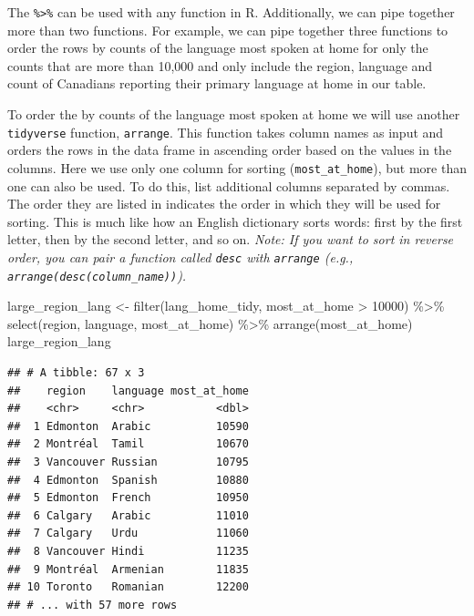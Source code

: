 \documentclass[
]{krantz}
\makeatletter
\newenvironment{Shaded}{\begin{snugshade}}{\end{snugshade}}
\newcommand{\DecValTok}[1]{\textcolor[rgb]{0.06,0.06,0.06}{#1}}
\newcommand{\FunctionTok}[1]{\textcolor[rgb]{0,0,0}{#1}}
\newcommand{\NormalTok}[1]{#1}
\newcommand{\OtherTok}[1]{\textcolor[rgb]{0.37,0.37,0.37}{#1}}
\newcommand{\SpecialCharTok}[1]{\textcolor[rgb]{0,0,0}{#1}}
\newenvironment{kframe}{%
\medskip{}
\setlength{\fboxsep}{.8em}
 \def\at@end@of@kframe{}%
 \ifinner\ifhmode%
  \def\at@end@of@kframe{\end{minipage}}%
  \begin{minipage}{\columnwidth}%
 \fi\fi%
 \def\FrameCommand##1{\hskip\@totalleftmargin \hskip-\fboxsep
 \colorbox{shadecolor}{##1}\hskip-\fboxsep
     \hskip-\linewidth \hskip-\@totalleftmargin \hskip\columnwidth}%
 \MakeFramed {\advance\hsize-\width
   \@totalleftmargin\z@ \linewidth\hsize
   \@setminipage}}%
 {\par\unskip\endMakeFramed%
 \at@end@of@kframe}
\renewenvironment{Shaded}{\begin{kframe}}{\end{kframe}}
\makeatother
\begin{document}
The \texttt{\%\textgreater{}\%} can be used with any function in R. Additionally, we can pipe together more than two functions. For example, we can pipe together three functions to order the rows by counts of the language most spoken at home for only the counts that are more than 10,000 and only include the region, language and count of Canadians reporting their primary language at home in our table.

To order the by counts of the language most spoken at home we will use another
\texttt{tidyverse} function, \texttt{arrange}. This function takes column names as input and
orders the rows in the data frame in ascending order based on the values in the
columns. Here we use only one column for sorting (\texttt{most\_at\_home}), but more than
one can also be used. To do this, list additional columns separated by commas.
The order they are listed in indicates the order in which they will be used for
sorting. This is much like how an English dictionary sorts words: first by the
first letter, then by the second letter, and so on. \emph{Note: If you want to sort
in reverse order, you can pair a function called \texttt{desc} with \texttt{arrange} (e.g.,
\texttt{arrange(desc(column\_name))}).}

\begin{Shaded}
\begin{Highlighting}[]
\NormalTok{large\_region\_lang }\OtherTok{\textless{}{-}} \FunctionTok{filter}\NormalTok{(lang\_home\_tidy, most\_at\_home }\SpecialCharTok{\textgreater{}} \DecValTok{10000}\NormalTok{) }\SpecialCharTok{\%\textgreater{}\%}
  \FunctionTok{select}\NormalTok{(region, language, most\_at\_home) }\SpecialCharTok{\%\textgreater{}\%}
  \FunctionTok{arrange}\NormalTok{(most\_at\_home)}
\NormalTok{large\_region\_lang}
\end{Highlighting}
\end{Shaded}

\begin{verbatim}
## # A tibble: 67 x 3
##    region    language most_at_home
##    <chr>     <chr>           <dbl>
##  1 Edmonton  Arabic          10590
##  2 Montréal  Tamil           10670
##  3 Vancouver Russian         10795
##  4 Edmonton  Spanish         10880
##  5 Edmonton  French          10950
##  6 Calgary   Arabic          11010
##  7 Calgary   Urdu            11060
##  8 Vancouver Hindi           11235
##  9 Montréal  Armenian        11835
## 10 Toronto   Romanian        12200
## # ... with 57 more rows
\end{verbatim}
\end{document}
